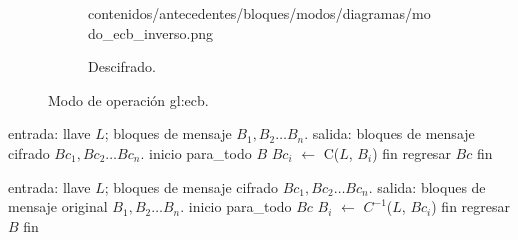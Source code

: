 \begin{figure}[H]
\begin{subfigure}{0.45\textwidth}
\begin{center}
            {contenidos/antecedentes/bloques/modos/diagramas/modo_ecb_inverso.png}
          \caption{Descifrado.}
      \end{center}
  \end{subfigure}
  \caption{Modo de operación \acrshort{gl:ecb}.}
  \label{figura:ecb}
\end{figure}

\begin{pseudocodigo}[caption={Modo de operación \acrshort{gl:ecb}, cifrado.}]
  entrada: llave $ L $; bloques de mensaje $ B_1, B_2 \dots B_n $.
  salida:  bloques de mensaje cifrado $ Bc_1, Bc_2 \dots Bc_n $.
  inicio
    para_todo $B$
      $Bc_i$ $\gets$ C($L$, $B_i$)
    fin
    regresar $Bc$
  fin
\end{pseudocodigo}

\begin{pseudocodigo}[caption={Modo de operación \acrshort{gl:ecb}, descifrado.}]
  entrada: llave $ L $; bloques de mensaje cifrado $ Bc_1, Bc_2 \dots Bc_n $.
  salida:  bloques de mensaje original $ B_1, B_2 \dots B_n $.
  inicio
    para_todo $Bc$
      $B_i$ $\gets$ $C^{-1}$($L$, $Bc_i$)
    fin
    regresar $B$
  fin
\end{pseudocodigo}
